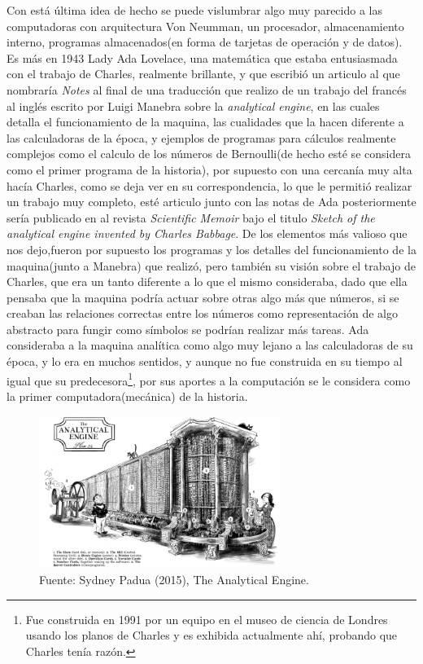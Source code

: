\documentclass[letterpaper,12pt,oneside]{book}
\begin{document}
		Con está última idea de hecho se puede vislumbrar algo muy parecido a las computadoras con arquitectura Von Neumman, un procesador, almacenamiento interno,
		programas almacenados(en forma de tarjetas de operación y de datos)\cite[p.204]{oregan_brief_2012}. Es más en 1943 Lady Ada Lovelace, una matemática
		que estaba entusiasmada con el trabajo de Charles, realmente brillante, y que escribió un articulo al que 
		nombraría \textit{Notes} al final de una traducción que realizo de un trabajo
		del francés al inglés escrito por Luigi Manebra sobre la \textit{analytical engine}, en las cuales detalla el funcionamiento de la maquina, las cualidades que la 
		hacen diferente a las calculadoras de la época, y
		ejemplos de programas para cálculos realmente complejos como el calculo de los números de Bernoulli(de hecho esté se considera como
		el primer programa de la historia), por supuesto con una cercanía muy alta hacía Charles, como se deja ver en su correspondencia, lo que le permitió realizar un 	
		trabajo muy completo, esté articulo junto con las notas de Ada posteriormente sería publicado
		en al revista \textit{Scientific Memoir} bajo el titulo \textit{Sketch of the analytical engine invented by Charles Babbage}. De los elementos más valioso que nos 
		dejo,fueron por supuesto los programas y los detalles del funcionamiento de la maquina(junto a Manebra) que realizó, pero también su visión sobre el trabajo de 
		Charles, que era un tanto diferente a lo que el mismo consideraba, dado que 
		ella pensaba que la maquina podría actuar sobre otras algo más que números, si se creaban las relaciones correctas entre los números  como representación de algo 
		abstracto para fungir como símbolos se podrían realizar más tareas. Ada consideraba a la maquina analítica como algo muy lejano a las calculadoras de su época,
		y lo era en muchos sentidos, y aunque no fue construida en su tiempo al igual que su predecesora\footnote{Fue construida en 1991 por un equipo en el museo de ciencia de Londres usando los planos de Charles y es exhibida actualmente ahí, probando que Charles tenía razón.}, por sus aportes a la computación
		se le considera como la primer computadora(mecánica) de la historia\cite{eric_kim_ada_1999}.
		
		\begin{figure}
		    \centering
		    \includegraphics[width=0.7\textwidth]{media/Historia/analyticalEngine1_sydbeypadua.jpg}
		    \caption{Fuente: Sydney Padua (2015), The Analytical Engine.}
	    	\label{fig:analytical_engine}
		\end{figure}
				
\end{document}
